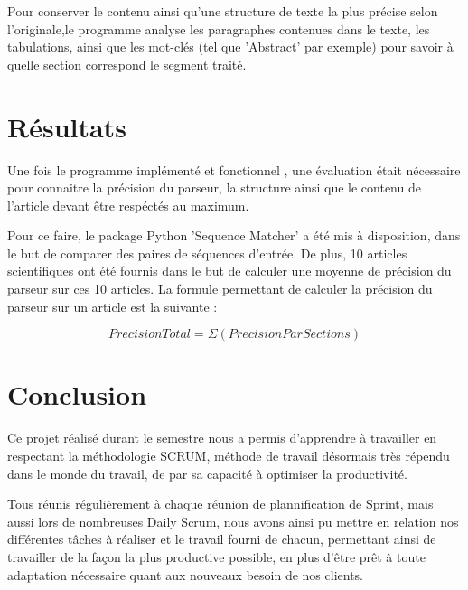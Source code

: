 \documentclass[11pt,a4paper]{article}
\begin{document}
Pour conserver le contenu ainsi qu'une structure de texte la plus précise selon l'originale,le programme analyse les paragraphes contenues dans le texte, les tabulations, ainsi que les mot-clés (tel que 'Abstract' par exemple) pour savoir à quelle section correspond le segment traité.





\section{Résultats}

Une fois le programme implémenté et fonctionnel , une évaluation était nécessaire pour connaitre la précision du parseur, la structure ainsi que le contenu de l'article devant être respéctés au maximum.

Pour ce faire, le package Python 'Sequence Matcher' a été mis à disposition, dans le but de comparer des paires de séquences d'entrée.
De plus, 10 articles scientifiques ont été fournis dans le but de calculer une moyenne de précision du parseur sur ces 10 articles.
La formule permettant de calculer la précision du parseur sur un article est la suivante : 

\[ PrecisionTotal = \Sigma (Precision Par Sections)\]




\section{Conclusion}

Ce projet réalisé durant le semestre nous a permis d'apprendre à travailler en respectant la méthodologie SCRUM, méthode de travail désormais très répendu dans le monde du travail, de par sa capacité à optimiser la productivité.

Tous réunis régulièrement à chaque réunion de plannification de Sprint, mais aussi lors de nombreuses Daily Scrum, nous avons ainsi pu mettre en relation nos différentes tâches à réaliser et le travail fourni de chacun, permettant ainsi de travailler de la façon la plus productive possible, en plus d'être prêt à toute adaptation nécessaire quant aux nouveaux besoin de nos clients.
\end{document}
